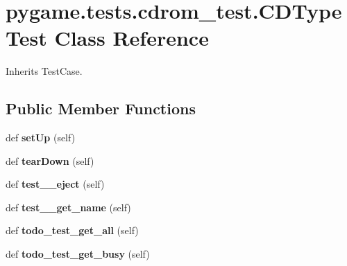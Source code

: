 \hypertarget{classpygame_1_1tests_1_1cdrom__test_1_1_c_d_type_test}{}\section{pygame.\+tests.\+cdrom\+\_\+test.\+C\+D\+Type\+Test Class Reference}
\label{classpygame_1_1tests_1_1cdrom__test_1_1_c_d_type_test}


Inherits Test\+Case.

\subsection*{Public Member Functions}
\begin{DoxyCompactItemize}
\item 
\mbox{\label{classpygame_1_1tests_1_1cdrom__test_1_1_c_d_type_test_ab261d15836bd181f10c5c3a89e5672e0}} 
def {\bfseries set\+Up} (self)
\item 
\mbox{\label{classpygame_1_1tests_1_1cdrom__test_1_1_c_d_type_test_aee0f4d14c418b4c964957ff632e28e7e}} 
def {\bfseries tear\+Down} (self)
\item 
\mbox{\label{classpygame_1_1tests_1_1cdrom__test_1_1_c_d_type_test_a48e906ee536cfbcad15bbd0cf7e550bb}} 
def {\bfseries test\+\_\+\_\+eject} (self)
\item 
\mbox{\label{classpygame_1_1tests_1_1cdrom__test_1_1_c_d_type_test_a3b9af44276192a0c0c2b8032eeaed221}} 
def {\bfseries test\+\_\+\_\+get\+\_\+name} (self)
\item 
\mbox{\label{classpygame_1_1tests_1_1cdrom__test_1_1_c_d_type_test_a987f1faf00af3a48f77252ec08be8f16}} 
def {\bfseries todo\+\_\+test\+\_\+get\+\_\+all} (self)
\item 
\mbox{\label{classpygame_1_1tests_1_1cdrom__test_1_1_c_d_type_test_ad986520535e677c6841008e25def1e77}} 
def {\bfseries todo\+\_\+test\+\_\+get\+\_\+busy} (self)

\end{DoxyCompactItemize}
